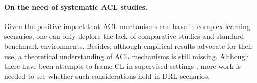 \documentclass{article}
\begin{document}


\paragraph{On the need of systematic ACL studies.}Given the positive impact that ACL mechanisms can have in complex learning scenarios, one can only deplore the lack of comparative studies and standard benchmark environments. Besides, although empirical results advocate for their use, a theoretical understanding of ACL mechanisms is still missing. Although there have been attempts to frame CL in supervised settings \cite{bengiocl,hacohen19a-scoring-pacing}, more work is needed to see whether such considerations hold in DRL scenarios.


 
\end{document}
